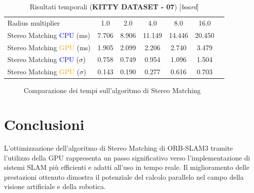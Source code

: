 \documentclass[12pt,a4paper]{report}
\begin{document}

\newpage
\begin{table}[H]
    \centering
    \caption{Risultati temporali (\textbf{KITTY DATASET - 07}) [\textit{board}] }
    \begin{tabular}{lcccccc}
        \toprule
        \rowcolor{gray!20}
        Radius multiplier & 1.0 & \cellcolor{orange!40}2.0 & 4.0 & 8.0 & 16.0 \\
        Stereo Matching \textcolor{blue}{CPU} (ms) & 7.706 & 8.906 & 11.149 & 14.446 & 20.450\\
        Stereo Matching \textcolor{orange}{GPU} (ms) & 1.905 & 2.099 & 2.206 & 2.740 & 3.479 \\
        Stereo Matching \textcolor{blue}{CPU} ($\sigma$) & 0.758 & 0.749 & 0.954 & 1.096 & 1.504\\
        Stereo Matching \textcolor{orange}{GPU} ($\sigma$) & 0.143 & 0.190 & 0.277 & 0.616 & 0.703 \\
        \bottomrule
    \end{tabular}
\end{table}

\begin{figure}[H]
    \centering
    \caption{Comparazione dei tempi sull'algoritmo di Stereo Matching }
\end{figure}



\chapter{Conclusioni}

L'ottimizzazione dell'algoritmo di Stereo Matching di ORB-SLAM3 tramite l'utilizzo della GPU rappresenta un passo significativo verso l'implementazione di sistemi SLAM più efficienti e adatti all'uso in tempo reale. Il miglioramento delle prestazioni ottenuto dimostra il potenziale del calcolo parallelo nel campo della visione artificiale e della robotica.
\end{document}

